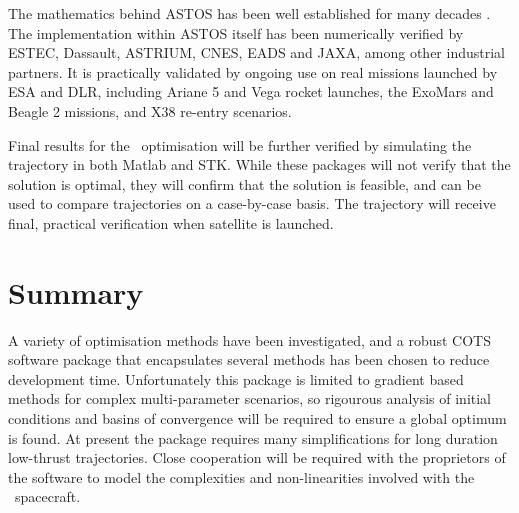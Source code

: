 The mathematics behind ASTOS has been well established for many decades \parencite{Kaplan1976}. The implementation within ASTOS itself has been numerically verified by ESTEC, Dassault, ASTRIUM, CNES, EADS and JAXA, among other industrial partners. It is practically validated by ongoing use on real missions launched by ESA and DLR, including Ariane 5 and Vega rocket launches, the ExoMars and Beagle 2 missions, and X38 re-entry scenarios.
 
Final results for the \BW\ optimisation will be further verified by simulating the trajectory in both Matlab and STK. While these packages will not verify that the solution is optimal, they will confirm that the solution is feasible, and can be used to compare trajectories on a case-by-case basis. The trajectory will receive final, practical verification when satellite is launched.

\section{Summary} \label{sec:Optimisation-Summary}

A variety of optimisation methods have been investigated, and a robust COTS software package that encapsulates several methods has been chosen to reduce development time. Unfortunately this package is limited to gradient based methods for complex multi-parameter scenarios, so rigourous analysis of initial conditions and basins of convergence will be required to ensure a global optimum is found. At present the package requires many simplifications for long duration low-thrust trajectories. Close cooperation will be required with the proprietors of the software to model the complexities and non-linearities involved with the \BW\ spacecraft.
 
\clearpage